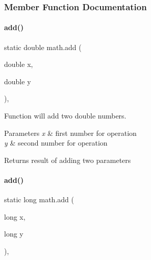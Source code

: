 \subsubsection{Member Function Documentation}
\mbox{\label{classmath_aedbba5022af9004b0203aea54267aa47}} 
\paragraph{\texorpdfstring{add()}{add()}\hspace{0.1cm}{\footnotesize\ttfamily [1/4]}}
{\footnotesize\ttfamily static double math.\+add (\begin{DoxyParamCaption}\item[{double}]{x,  }\item[{double}]{y }\end{DoxyParamCaption})\hspace{0.3cm}{\ttfamily [inline]}, {\ttfamily [static]}}



Function will add two double numbers. 


\begin{DoxyParams}{Parameters}
{\em x} & first number for operation \\
\hline
{\em y} & second number for operation \\
\hline
\end{DoxyParams}
\begin{DoxyReturn}{Returns}
result of adding two parameters 
\end{DoxyReturn}
\mbox{\label{classmath_a13ad6680f54a9900e657909c9bd4452e}} 
\paragraph{\texorpdfstring{add()}{add()}\hspace{0.1cm}{\footnotesize\ttfamily [2/4]}}
{\footnotesize\ttfamily static long math.\+add (\begin{DoxyParamCaption}\item[{long}]{x,  }\item[{long}]{y }\end{DoxyParamCaption})\hspace{0.3cm}{\ttfamily [inline]}, {\ttfamily [static]}}



